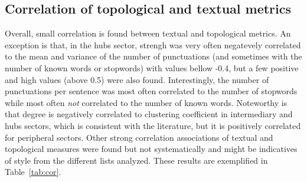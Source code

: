 
%
%
%
%
%
%
%
%
%
%
%
%
%





\subsection{Correlation of topological and textual metrics}\label{subsec:cor}


Overall, small correlation is found between textual and topological metrics.
An exception is that, in the hubs sector, strengh was very often negatevely correlated to the mean and variance of the number
of punctuations (and sometimes with the number of known words or stopwords)
with values bellow -0.4, but a few positive and high values (above 0.5) were also found.
Interestingly, the number of punctuations per sentence was most often correlated to the number of stopwords
while most often \emph{not} correlated to the number of known words.
Noteworthy is that degree is negatively correlated to clustering coefficient in intermediary and hubs sectors,
which is consistent with the literature, but it is positively correlated for
peripheral sectors.
Other strong correlation associations of textual and topological measures were found
but not systematically and might be indicatives of style from the different lists analyzed.
These results are exemplified in Table~\ref{tab:cor}.

